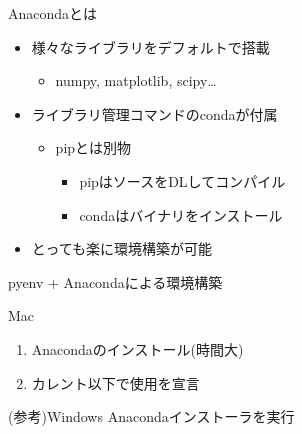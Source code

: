 \documentclass[12pt, dvipdfmx]{beamer}
\begin{document}
\begin{frame}{Anacondaとは}
    \begin{itemize}
        \item 様々なライブラリをデフォルトで搭載
        \begin{itemize}
            \item numpy, matplotlib, scipy…
        \end{itemize}
        \item ライブラリ管理コマンドのcondaが付属
        \begin{itemize}
            \item pipとは別物
            \begin{itemize}
                \item pipはソースをDLしてコンパイル
                \item condaはバイナリをインストール
            \end{itemize}
        \end{itemize}
        \item<2|alert@2> とっても楽に環境構築が可能
    \end{itemize}
\end{frame}
\begin{frame}{pyenv + Anacondaによる環境構築}
    \begin{block}{Mac}
        \begin{enumerate}
            \item Anacondaのインストール(時間大)
            \installanaconda
            \item カレント以下で使用を宣言
            \useanaconda
        \end{enumerate}
    \end{block}
    \begin{exampleblock}{(参考)Windows}
        Anacondaインストーラを実行
    \end{exampleblock}
\end{frame}
\end{document}
